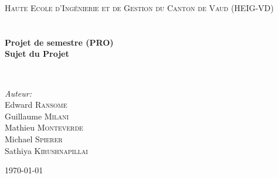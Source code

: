 \begin{titlepage}
\begin{center}


\textsc{\LARGE Haute Ecole d'Ingénierie et de Gestion du Canton de Vaud (HEIG-VD)}\\[1.5cm]

\textsc{\Large }\\[0.5cm]

\HRule \\[0.4cm]

{\huge \bfseries Projet de semestre (PRO)\\
Sujet du Projet \\[0.4cm] }

\HRule \\[1.5cm]

\begin{minipage}{0.4\textwidth}
\begin{flushleft} \large
\emph{Auteur:}\\
Edward \textsc{Ransome}\\
Guillaume \textsc{Milani}\\
Mathieu \textsc{Monteverde}\\
Michael \textsc{Spierer}\\
Sathiya \textsc{Kirushnapillai}
\end{flushleft}
\end{minipage}
\begin{minipage}{0.4\textwidth}
\begin{flushright} \large
\end{flushright}
\end{minipage}

\vfill

{\large \today}

\end{center}
\end{titlepage}
